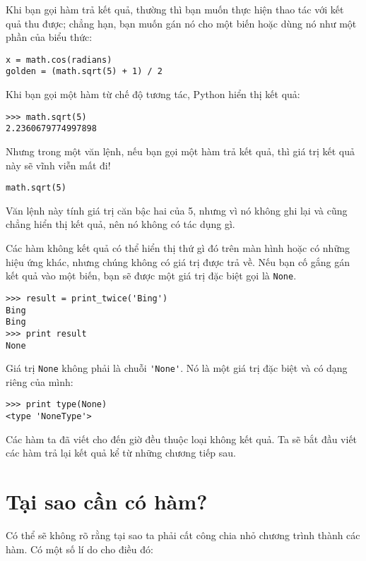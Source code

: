 \documentclass[11pt]{book}
\begin{document}
Khi bạn gọi hàm trả kết quả, thường thì bạn muốn thực hiện thao
tác với kết quả thu được; chẳng hạn, bạn muốn gán nó cho một biến
hoặc dùng nó như một phần của biểu thức:

\beforeverb
\begin{verbatim}
x = math.cos(radians)
golden = (math.sqrt(5) + 1) / 2
\end{verbatim}
\afterverb
%
Khi bạn gọi một hàm từ chế độ tương tác, Python hiển thị kết quả:

\beforeverb
\begin{verbatim}
>>> math.sqrt(5)
2.2360679774997898
\end{verbatim}
\afterverb
%
Nhưng trong một văn lệnh, nếu bạn gọi một hàm trả kết quả, thì
giá trị kết quả này sẽ vĩnh viễn mất đi!

\beforeverb
\begin{verbatim}
math.sqrt(5)
\end{verbatim}
\afterverb
%
Văn lệnh này tính giá trị căn bậc hai của 5, nhưng vì nó không
ghi lại và cũng chẳng hiển thị kết quả, nên nó không có tác dụng gì.


Các hàm không kết quả có thể hiển thị thứ gì đó trên màn hình hoặc
có những hiệu ứng khác, nhưng chúng không có giá trị được trả về.
Nếu bạn cố gắng gán kết quả vào một biến, bạn sẽ được một giá trị
đặc biệt gọi là {\tt None}.


\beforeverb
\begin{verbatim}
>>> result = print_twice('Bing')
Bing
Bing
>>> print result
None
\end{verbatim}
\afterverb
%
Giá trị {\tt None} không phải là chuỗi \verb"'None'". 
Nó là một giá trị đặc biệt và có dạng riêng của mình:

\beforeverb
\begin{verbatim}
>>> print type(None)
<type 'NoneType'>
\end{verbatim}
\afterverb
%
Các hàm ta đã viết cho đến giờ đều thuộc loại không kết quả.
Ta sẽ bắt đầu viết các hàm trả lại kết quả kể từ những chương tiếp sau.


\section{Tại sao cần có hàm?}

Có thể sẽ không rõ rằng tại sao ta phải cất công chia nhỏ 
chương trình thành các hàm. Có một số lí do cho điều đó:
\end{document}
